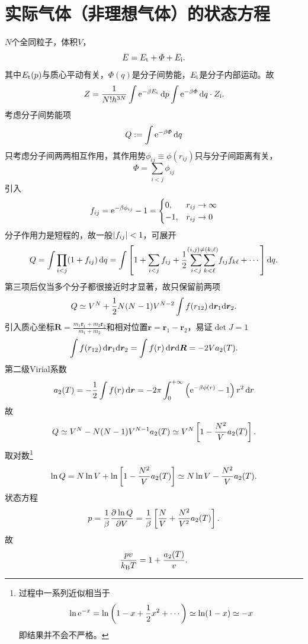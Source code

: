 \section[实际气体的状态方程]{实际气体（非理想气体）的状态方程}
$N$个全同粒子，体积$V$，
\[
	E=E_\mathrm t+\varPhi+E_{\mathrm{i}}.
\]
其中$E_\mathrm t(p)$与质心平动有关，$\varPhi(q)$是分子间势能，$E_{\mathrm{i}}$是分子内部运动。故
\[
	Z=\frac1{N!h^{3N}}\int\mathop{}\!\mathrm{e}^{-\beta E_\mathrm t}\mathop{}\!\mathrm{d} p\int\mathop{}\!\mathrm{e}^{-\beta\varPhi}\mathop{}\!\mathrm{d} q\cdot Z_{\mathrm{i}}.
\]
考虑分子间势能项
\[
	Q:=\int\mathop{}\!\mathrm{e}^{-\beta\varPhi}\mathop{}\!\mathrm{d} q
\]
只考虑分子间两两相互作用，其作用势$\phi_{ij}\equiv\phi(r_{ij})$只与分子间距离有关，
\[
	\varPhi=\sum_{i<j}\phi_{ij}
\]
引入
\[
	f_{ij}=\mathop{}\!\mathrm{e}^{-\beta\phi_{ij}}-1=
	\begin{cases}
		0,&r_{ij}\to\infty\\
		-1,&r_{ij}\to0
	\end{cases}
\]
分子作用力是短程的，故一般$\left\lvert f_{ij}\right\rvert<1$，可展开
\[
	Q=\int\prod_{i<j}(1+f_{ij})\mathop{}\!\mathrm{d} q=\int\left[1+\sum_{i<j}f_{ij}+\frac12\overset{(i,j)\neq(k,\ell)}{\sum_{i<j}\sum_{k<\ell}}f_{ij}f_{k\ell}+\cdots\right]\mathop{}\!\mathrm{d} q.
\]
第三项后仅当多个分子都很接近时才显著，故只保留前两项
\[
	Q\simeq V^N+\frac12N(N-1)V^{N-2}\int f(r_{12})\mathop{}\!\mathrm{d}\bm r_1\mathrm{d}\bm r_2.
\]
引入质心坐标$\bm R=\frac{m_1\bm r_1+m_2\bm r_2}{m_1+m_2}$和相对位置$\bm r=\bm r_1-\bm r_2$，易证$\det J=1$
\[
	\int f(r_{12})\mathop{}\!\mathrm{d}\bm r_1\mathrm{d}\bm r_2=\int f(r)\mathop{}\!\mathrm{d}\bm r\mathrm{d}\bm R=-2Va_2(T).
\]
第二级Virial系数
\begin{align}
	a_2(T)=-\frac12\int f(r)\mathop{}\!\mathrm{d}\bm r=-2\pi\int_0^{+\infty}\left(\mathop{}\!\mathrm{e}^{-\beta\phi(r)}-1\right)r^2\mathop{}\!\mathrm{d} r
\end{align}
故
\[
	Q\simeq V^N-N(N-1)V^{N-1}a_2(T)\simeq V^N\left[1-\frac{N^2}Va_2(T)\right].
\]
取对数\footnote{过程中一系列近似相当于
\[
	\ln\mathop{}\!\mathrm{e}^{-x}=\ln\left(1-x+\frac12x^2+\cdots\right)\simeq\ln(1-x)\simeq -x
\]
即结果并不会不严格。}
\begin{align}
	\ln Q=N\ln V+\ln\left[1-\frac{N^2}Va_2(T)\right]\simeq N\ln V-\frac{N^2}Va_2(T).
\end{align}
状态方程
\begin{align*}
	p=\frac1\beta\frac{\partial^{{}}\ln Q}{\partial{V}^{{}}}=\frac1\beta\left[\frac NV+\frac{N^2}{V^2}a_2(T)\right].
\end{align*}
故
\begin{align}
	\frac{pv}{k_{\mathrm B} T}=1+\frac{a_2(T)}v.
\end{align}
